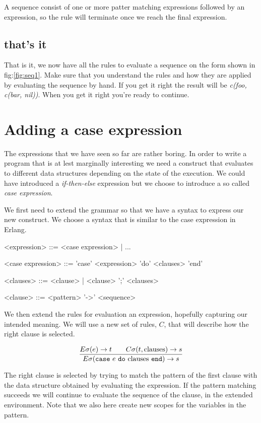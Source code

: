 \documentclass[a4paper,11pt]{article}
\begin{document}
A sequence consist of one or more patter matching expressions
followed by an expression, so the rule will terminate once we reach
the final expression.

\subsection{that's it}

That is it, we now have all the rules to evaluate a sequence on the
form shown in fig:\ref{fig:seq1}. Make sure that you understand
the rules and how they are applied by evaluating the sequence by
hand. If you get it right the result will be {\em c(foo, c(bar,
  nil))}. When you get it right you're ready to continue.


\section{Adding a case expression}

The expressions that we have seen so far are rather boring. In order to
write a program that is at lest marginally interesting we need a
construct that evaluates to different data structures depending on the
state of the execution. We could have introduced a {\em if-then-else}
expression but we choose to introduce a so called {\em case expression}.

We first need to extend the grammar so that we have a syntax to express
our new construct. We choose a syntax that is similar to the case
expression in Erlang.

\begin{grammar}
     <expression> ::=  <case expression> | ...  

     <case expression> ::= 'case' <expression> 'do' <clauses>  'end' 

     <clauses> ::=   <clause> | <clause> ';' <clauses>

     <clause> ::=  <pattern> '-\textgreater' <sequence>
\end{grammar}

We then extend the rules for evaluation an expression, hopefully
capturing our intended meaning. We will use a new set of rules, $C$,
that will describe how the right clause is selected. 


$$\frac{E\sigma(e) \rightarrow t \qquad C\sigma(t, {\rm clauses}) \rightarrow s }{E\sigma({\tt case}\ e \ {\tt do}\ {\rm clauses} \ {\tt end}) \rightarrow s}$$

The right clause is selected by trying to match the pattern of the
first clause with the data structure obtained by evaluating the
expression. If the pattern matching succeeds we will continue to
evaluate the sequence of the clause, in the extended environment. Note
that we also here create new scopes for the variables in the pattern.
\end{document}
